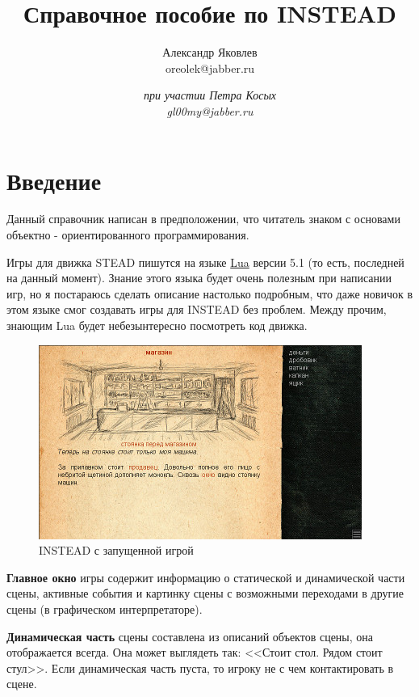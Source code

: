 \documentclass[a4paper,12pt]{article}
\begin{document}
\title{Справочное пособие по INSTEAD}
\author{Александр Яковлев\\oreolek@jabber.ru \and \textit{при участии Петра Косых}\\\textit{gl00my@jabber.ru}}
\maketitle
\tableofcontents
\clearpage
\section{Введение}
Данный справочник написан в предположении, что читатель знаком с основами объектно - ориентированного программирования.

Игры для движка STEAD пишутся на языке \href{http://www.lua.org}{Lua} версии 5.1 (то есть, последней на данный момент). Знание этого языка будет очень полезным при написании игр, но я постараюсь сделать описание настолько подробным, что даже новичок в этом языке смог создавать игры для INSTEAD без проблем. Между прочим, знающим Lua будет небезынтересно посмотреть код движка.

\begin{figure}
\includegraphics[scale=0.7]{1.jpg}
\caption{INSTEAD с запущенной игрой}
\label{INSTEAD-running}
\end{figure}

\textbf{Главное окно} игры содержит информацию о статической и динамической части сцены, активные события и картинку сцены с возможными переходами в другие сцены (в графическом интерпретаторе).

\textbf{Динамическая часть} сцены составлена из описаний объектов сцены, она отображается всегда. Она может выглядеть так: <<Стоит стол. Рядом стоит стул>>. Если динамическая часть пуста, то игроку не с чем контактировать в сцене.
\end{document}
